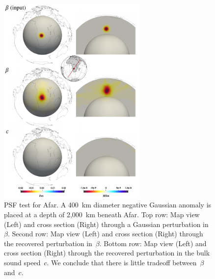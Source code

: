 \documentclass[extra,mreferee]{gji}
\begin{document}
\begin{figure}
  \centering
  \includegraphics[width=0.65\textwidth]{figures/psf/afar.pdf}
  \caption{\small{PSF test for Afar.
    A 400~km diameter negative Gaussian anomaly is placed at a depth of 2,000~km beneath Afar.
  Top row: Map view (Left) and cross section (Right) through a Gaussian perturbation in~$\beta$.
  Second row: Map view (Left) and cross section (Right) through the recovered perturbation in~$\beta$.
  Bottom row: Map view (Left) and cross section (Right) through the recovered perturbation in the bulk sound speed~$c$. We conclude that there is little tradeoff between~$\beta$ and~$c$.
  }}
  \label{fig:psf_afar}
\end{figure}
\end{document}
